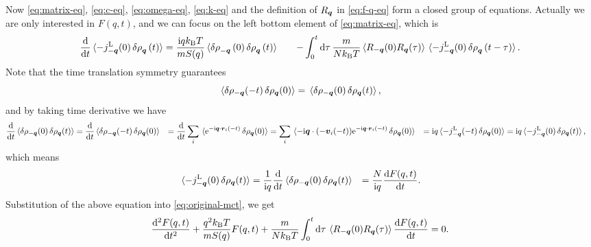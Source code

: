\documentclass[hyperref, a4paper]{article}
\newcommand*{\ii}{\mathrm{i}}
\newcommand*{\ee}{\mathrm{e}}
\def\\{}%
\begin{document}
Now \eqref{eq:matrix-eq}, \eqref{eq:c-eq}, \eqref{eq:omega-eq}, \eqref{eq:k-eq} and the definition of $R_{\vb*{q}}$ 
in \eqref{eq:f-q-eq} form a closed group of equations. Actually we are only interested in $F(q, t)$,
and we can focus on the left bottom element of \eqref{eq:matrix-eq}, which is 
\begin{equation}
    \begin{aligned}
        \dv{t} \expval*{ - j^\text{L}_{-\vb*{q}}(0) \var{\rho}_{\vb*{q}}(t) } 
        &= \frac{\ii q k_\text{B} T}{m S(q)} \expval*{ \var{\rho}_{-\vb*{q}}(0) \var{\rho}_{\vb*{q}}(t) } \\
        &\quad - \int_0^t \dd{\tau} \frac{m}{N k_\text{B} T} \expval*{R_{-\vb*{q}}(0) R_{\vb*{q}}(\tau)} \expval*{ - j^\text{L}_{-\vb*{q}}(0) \var{\rho}_{\vb*{q}}(t - \tau) } .
    \end{aligned}
    \label{eq:original-mct}
\end{equation}
Note that the time translation symmetry guarantees
\[
    \expval*{\var{\rho_{-\vb*{q}}(-t)} \var{\rho_{\vb*{q}}(0)}} = \expval*{\var{\rho_{-\vb*{q}}(0)} \var{\rho_{\vb*{q}}(t)}},
\]
and by taking time derivative we have 
\[
    \begin{aligned}
        \dv{t} \expval*{\var{\rho_{-\vb*{q}}(0)} \var{\rho_{\vb*{q}}(t)}} &= 
        \dv{t} \expval*{\var{\rho_{-\vb*{q}}(-t)} \var{\rho_{\vb*{q}}(0)}} \\
        &= \dv{t} \sum_i \expval*{\ee^{- \ii \vb*{q} \cdot \vb*{r}_i (-t)} \var{\rho_{\vb*{q}}(0)}}  \\
        &= \sum_i \expval*{ - \ii \vb*{q} \cdot (- \vb*{v}_i(-t)) \ee^{- \ii \vb*{q} \cdot \vb*{r}_i (-t)} \var{\rho_{\vb*{q}}(0)}}  \\
        &= \ii q \expval*{- j^\text{L}_{-\vb*{q}}(-t) \var{\rho_{\vb*{q}}(0)}} \\
        &= \ii q \expval*{- j^\text{L}_{-\vb*{q}}(0) \var{\rho_{\vb*{q}}(t)}},
    \end{aligned}
\]
which means 
\[
    \begin{aligned}
        \expval*{- j^\text{L}_{-\vb*{q}}(0) \var{\rho_{\vb*{q}}(t)}} 
        &= \frac{1}{\ii q} \dv{t} \expval*{\var{\rho_{-\vb*{q}}(0)} \var{\rho_{\vb*{q}}(t)}} \\
        &= \frac{N}{\ii q} \dv{F(q, t)}{t} .
    \end{aligned}
\]
Substitution of the above equation into \eqref{eq:original-mct}, we get 
\begin{equation}
    \dv[2]{F(q, t)}{t} + \frac{q^2 k_\text{B} T}{m S(q)} F(q, t) + \frac{m}{N k_\text{B} T} \int_0^t \dd{\tau} \expval*{R_{-\vb*{q}}(0) R_{\vb*{q}}(\tau)} \dv{F(q, t)}{t} = 0.
    \label{eq:exact-mct}
\end{equation}
\end{document}
